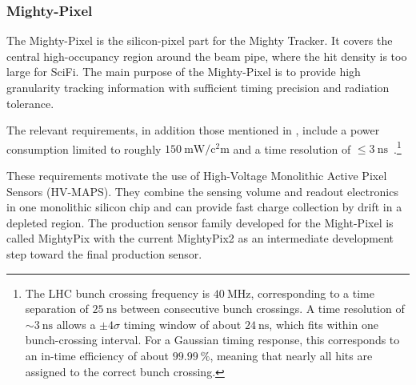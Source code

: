 \subsubsection{Mighty-Pixel}
The Mighty-Pixel is the silicon-pixel part for the Mighty Tracker. It covers the central high-occupancy region around the beam pipe, where the hit density is too large for SciFi. The main purpose of the Mighty-Pixel is to provide high granularity tracking information with sufficient timing precision and radiation tolerance.\par
The relevant requirements, in addition those mentioned in , include a power consumption limited to roughly $\SI{150}{\milli\watt\per\square\centi\meter}$ and a time resolution of $\leq\SI{3}{\nano\second}$~\cite{CERN-LHCC-2021-012}.\footnote{The LHC bunch crossing frequency is $\SI{40}{\mega\hertz}$, corresponding to a time separation of $\SI{25}{\nano\second}$ between consecutive bunch crossings. A time resolution of $\sim\SI{3}{\nano\second}$ allows a $\pm 4\sigma$ timing window of about $\SI{24}{\nano\second}$, which fits within one bunch-crossing interval. For a Gaussian timing response, this corresponds to an in-time efficiency of about $\SI{99.99}{\percent}$, meaning that nearly all hits are assigned to the correct bunch crossing.}\par
These requirements motivate the use of High-Voltage Monolithic Active Pixel Sensors (HV-MAPS). They combine the sensing volume and readout electronics in one monolithic silicon chip and can provide fast charge collection by drift in a depleted region. The production sensor family developed for the Might-Pixel is called MightyPix with the current MightyPix2 as an intermediate development step toward the final production sensor.
%
